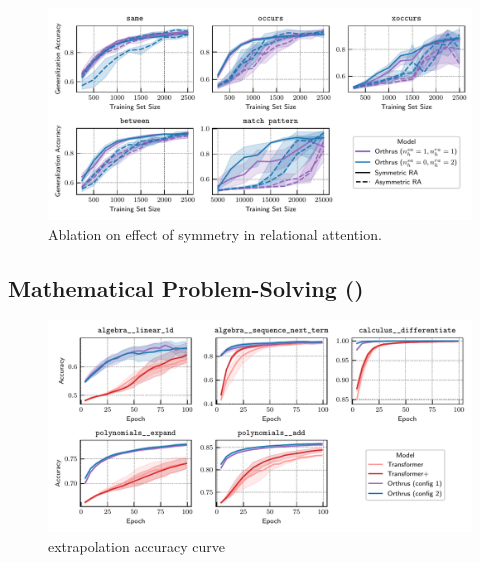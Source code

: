 \begin{figure}
    \centering
    \includegraphics[width=\textwidth]{figs/experiments/relgames/relgames_learning_curves_symmetry_ablation.pdf}
    \caption{Ablation on effect of symmetry in relational attention.}\label{fig:relgames_symmetry_ablation}
\end{figure}


\subsection{Mathematical Problem-Solving ()}\label{ssec:appendix_math}

\begin{figure}
    \centering
    \includegraphics[width=\textwidth]{figs/experiments/math/math_training_curves_extrapolation.pdf}
    \caption{extrapolation accuracy curve}
\end{figure}

